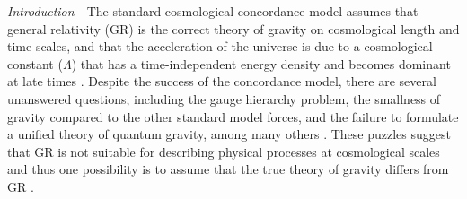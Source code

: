 \documentclass[prd,twocolumn,aps,psfig,nofootinbib,nobibnotes,superscriptaddress,preprintnumbers,times]{revtex4-2}
\begin{document}
\maketitle

\textit{Introduction}---The standard cosmological concordance model assumes that general relativity (GR) is the correct theory of gravity on cosmological length and time scales, and that the acceleration of the universe is due to a cosmological constant ($\Lambda$) that has a time-independent energy density and becomes dominant at late times \cite{Ryden:1970vsj}. 
Despite the success of the concordance model, there are several unanswered questions, including the gauge hierarchy problem, the smallness of gravity compared to the other standard model forces, and the failure to formulate a unified theory of quantum gravity, among many others \cite{Dvali:2013qwe, Moffat:1998vi}. 
These puzzles suggest that GR is not suitable for describing physical processes at cosmological scales and thus one possibility is to assume that the true theory of gravity differs from GR \cite{deRham:2023byw}. 
\end{document}
